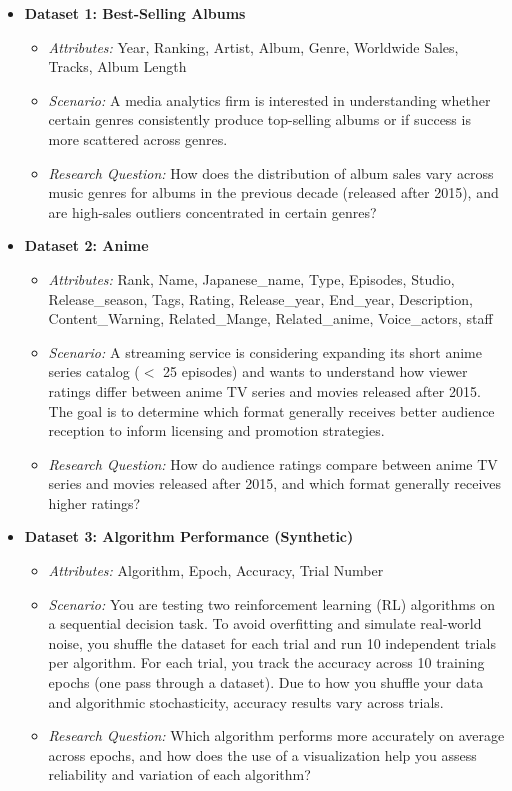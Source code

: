 \documentclass[11pt]{article}
\begin{document}
\begin{itemize}
    \item \textbf{Dataset 1: Best-Selling Albums}
    \begin{itemize}
    \item
    {\em Attributes:} Year, Ranking, Artist, Album, Genre, Worldwide Sales, Tracks, Album Length
    \item 
    {\em Scenario:} A media analytics firm is interested in understanding whether certain genres consistently produce top-selling albums or if success is more scattered across genres.\item
    {\em Research Question:} How does the distribution of album sales vary across music genres for albums in the previous decade (released after 2015), and are high-sales outliers concentrated in certain genres?
\end{itemize}
    \item \textbf{Dataset 2: Anime} 
    \begin{itemize}
        \item
    {\em Attributes:} Rank, Name, Japanese\_name, Type, Episodes, Studio, Release\_season, Tags, Rating, Release\_year, End\_year, Description, Content\_Warning, Related\_Mange, Related\_anime, Voice\_actors, staff
    
    \item
    {\em Scenario:}  A streaming service is considering expanding its short anime series catalog ($<$ 25 episodes) and wants to understand how viewer ratings differ between anime TV series and movies released after 2015. The goal is to determine which format generally receives better audience reception to inform licensing and promotion strategies. 

    \item
    {\em Research Question:} How do audience ratings compare between anime TV series and movies released after 2015, and which format generally receives higher ratings?
\end{itemize}

    \item \textbf{Dataset 3: Algorithm Performance (Synthetic)} 
    \begin{itemize}
    \item
    {\em Attributes:} Algorithm, Epoch, Accuracy, Trial Number 
    \item
    {\em Scenario:} You are testing two reinforcement learning (RL) algorithms on a sequential decision task. To avoid overfitting and simulate real-world noise, you shuffle the dataset for each trial and run 10 independent trials per algorithm. For each trial, you track the accuracy across 10 training epochs (one pass through a dataset). Due to how you shuffle your data and algorithmic stochasticity, accuracy results vary across trials. 
\item
   {\em  Research Question:} Which algorithm performs more accurately on average across epochs, and how does the use of a visualization help you assess reliability and variation of each algorithm?
      
\end{itemize}  
\end{itemize}
\end{document}
